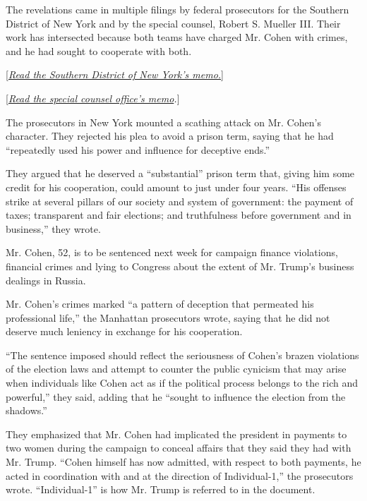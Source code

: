 The revelations came in multiple filings by federal prosecutors for the
Southern District of New York and by the special counsel, Robert S.
Mueller III. Their work has intersected because both teams have charged
Mr. Cohen with crimes, and he had sought to cooperate with both.

{[}\href{https://int.nyt.com/data/documenthelper/516-michael-cohen-manhattan/d85a4cc24e25b7ecf4ab/optimized/full.pdf\#page=1}{\emph{Read
the Southern District of New York's memo.}}{]}

{[}\href{https://int.nyt.com/data/documenthelper/517-michael-cohen-congress/d85a4cc24e25b7ecf4ab/optimized/full.pdf\#page=1}{\emph{Read
the special counsel office's memo}}\emph{.}{]}

The prosecutors in New York mounted a scathing attack on Mr. Cohen's
character. They rejected his plea to avoid a prison term, saying that he
had ``repeatedly used his power and influence for deceptive ends.''

They argued that he deserved a ``substantial'' prison term that, giving
him some credit for his cooperation, could amount to just under four
years. ``His offenses strike at several pillars of our society and
system of government: the payment of taxes; transparent and fair
elections; and truthfulness before government and in business,'' they
wrote.

Mr. Cohen, 52, is to be sentenced next week for campaign finance
violations, financial crimes and lying to Congress about the extent of
Mr. Trump's business dealings in Russia.

Mr. Cohen's crimes marked ``a pattern of deception that permeated his
professional life,'' the Manhattan prosecutors wrote, saying that he did
not deserve much leniency in exchange for his cooperation.

``The sentence imposed should reflect the seriousness of Cohen's brazen
violations of the election laws and attempt to counter the public
cynicism that may arise when individuals like Cohen act as if the
political process belongs to the rich and powerful,'' they said, adding
that he ``sought to influence the election from the shadows.''

They emphasized that Mr. Cohen had implicated the president in payments
to two women during the campaign to conceal affairs that they said they
had with Mr. Trump. ``Cohen himself has now admitted, with respect to
both payments, he acted in coordination with and at the direction of
Individual-1,'' the prosecutors wrote. ``Individual-1'' is how Mr. Trump
is referred to in the document.


